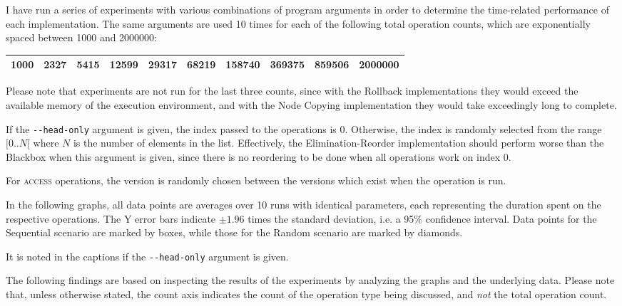 I have run a series of experiments with various combinations of program
arguments in order to determine the time-related performance of each
implementation. The same arguments are used 10 times for each of the following
total operation counts, which are exponentially spaced between 1000 and 2000000:

\begin{tabular}{|l|l|l|l|l|l|l|l|l|l|}
\hline
1000 & 2327 & 5415 & 12599 & 29317 & 68219 & 158740 & 369375 & 859506 & 2000000\\
\hline
\end{tabular}

Please note that experiments are not run for the last three counts, since with
the Rollback implementations they would exceed the available memory of the
execution environment, and with the Node Copying implementation they would take
exceedingly long to complete.

If the \texttt{-\@{}-head-only} argument is given, the index passed to the
operations is 0. Otherwise, the index is randomly selected from the range
$[0..N[$ where $N$ is the number of elements in the list. Effectively, the
Elimination-Reorder implementation should perform worse than the Blackbox when
this argument is given, since there is no reordering to be done when all
operations work on index 0.

For \textsc{access} operations, the version is randomly chosen between the
versions which exist when the operation is run.


In the following graphs, all data points are averages over 10 runs with
identical parameters, each representing the duration spent on the respective
operations. The Y error bars indicate $\pm 1.96$ times the standard deviation,
i.e. a 95\% confidence interval. Data points for the Sequential scenario are
marked by boxes, while those for the Random scenario are marked by diamonds.

It is noted in the captions if the \texttt{-\@{}-head-only} argument is given.

The following findings are based on inspecting the results of the experiments by
analyzing the graphs and the underlying data. Please note that, unless otherwise
stated, the count axis indicates the count of the operation type being
discussed, and \emph{not} the total operation count.

